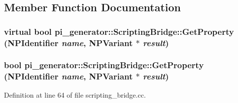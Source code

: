 \subsection{Member Function Documentation}
\hypertarget{classpi__generator_1_1_scripting_bridge_a6c4717a5a7d7c24c697d129904d0e0bf}{
\subsubsection[{GetProperty}]{\setlength{\rightskip}{0pt plus 5cm}virtual bool pi\_\-generator::ScriptingBridge::GetProperty (NPIdentifier {\em name}, \/  NPVariant $\ast$ {\em result})}}
\label{classpi__generator_1_1_scripting_bridge_a6c4717a5a7d7c24c697d129904d0e0bf}
\hypertarget{classpi__generator_1_1_scripting_bridge_ab97693ce171c216783e79debb3b192cc}{
\subsubsection[{GetProperty}]{\setlength{\rightskip}{0pt plus 5cm}bool pi\_\-generator::ScriptingBridge::GetProperty (NPIdentifier {\em name}, \/  NPVariant $\ast$ {\em result})}}
\label{classpi__generator_1_1_scripting_bridge_ab97693ce171c216783e79debb3b192cc}


Definition at line 64 of file scripting\_\-bridge.cc.

